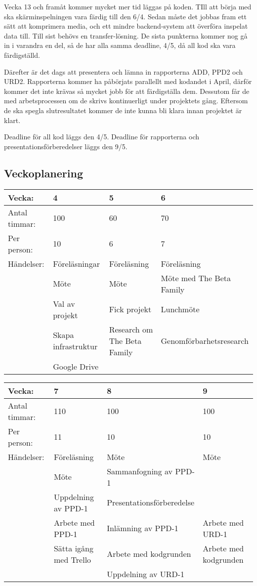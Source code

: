 Vecka 13 och framåt kommer mycket mer tid läggas på koden. TIll att börja med ska skärminspelningen vara färdig till den 6/4. Sedan måste det jobbas fram ett sätt att komprimera media, och ett mindre backend-system att överföra inspelat data till. Till sist behövs en transfer-lösning. De sista punkterna kommer nog gå in i varandra en del, så de har alla samma deadline, 4/5, då all kod ska vara färdigställd. 

Därefter är det dags att presentera och lämna in rapporterna ADD, PPD2 och URD2. Rapporterna kommer ha påbörjats parallellt med kodandet i April, därför kommer det inte krävas så mycket jobb för att färdigställa dem. Dessutom får de med arbetsprocessen om de skrivs kontinuerligt under projektets gång. Eftersom de ska spegla slutresultatet kommer de inte kunna bli klara innan projektet är klart. 

Deadline för all kod läggs den 4/5. Deadline för rapporterna och presentationsförberedelser läggs den 9/5. 


\subsection{Veckoplanering}

\begin{tabular}{ | p{65pt} || p{110pt} | p{110pt} | p{110pt} |}
  \hline
  Vecka: & 4 & 5 & 6 \\ \hline
  Antal timmar: & 100 & 60 & 70 \\ \hline
  Per person: & 10 & 6 & 7 \\ \hline
  Händelser: & Föreläsningar & Föreläsning & Föreläsning \\ \hline
  & Möte & Möte & Möte med The Beta Family  \\ \hline
  & Val av projekt & Fick projekt & Lunchmöte\\ \hline
  & Skapa infrastruktur & Research om The Beta Family & Genomförbarhetsresearch\\ \hline
  & Google Drive &  & \\ \hline
\end{tabular}

\begin{tabular}{ | p{65pt} || p{110pt} | p{110pt} | p{110pt} |}
  \hline
  Vecka: & 7 & 8 & 9  \\ \hline
  Antal timmar: & 110 & 100 & 100\\ \hline
  Per person: & 11 & 10 & 10\\ \hline
  Händelser: & Föreläsning & Möte & Möte\\ \hline
  & Möte & Sammanfogning av PPD-1 &\\ \hline
  & Uppdelning av PPD-1 & Presentationsförberedelse &  \\ \hline
  & Arbete med PPD-1 & Inlämning av PPD-1 & Arbete med URD-1 \\ \hline
  & Sätta igång med Trello & Arbete med kodgrunden & Arbete med kodgrunden \\ \hline
& & Uppdelning av URD-1 & \\ \hline
\end{tabular}

